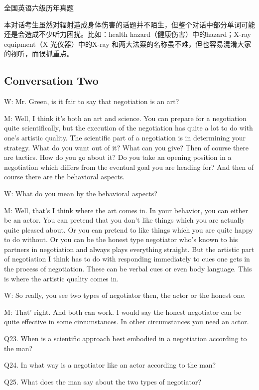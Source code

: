\documentclass[UTF8,11pt]{ctexart}
\begin{document}
全国英语六级历年真题


本对话考生虽然对辐射造成身体伤害的话题并不陌生，但整个对话中部分单词可能还是会造成不少听力困扰。比如：health hazard（健康伤害）中的hazard；X-ray equipment（X 光仪器）中的X-ray 和两大法案的名称虽不难，但也容易混淆大家的视听，而误抓重点。


\subsection*{Conversation Two}


W: Mr. Green, is it fair to say that negotiation is an art?


M: Well, I think it’s both an art and science. You can prepare for a negotiation quite scientifically, but the execution of the negotiation has quite a lot to do with one’s artistic quality. The scientific part of a negotiation is in determining your strategy. What do you want out of it? What can you give? Then of course there are tactics. How do you go about it? Do you take an opening position in a negotiation which differs from the eventual goal you are heading for? And then of course there are the behavioral aspects.


W: What do you mean by the behavioral aspects?


M: Well, that’s I think where the art comes in. In your behavior, you can either be an actor. You can pretend that you don’t like things which you are actually quite pleased about. Or you can pretend to like things which you are quite happy to do without. Or you can be the honest type negotiator who’s known to his partners in negotiation and always plays everything straight. But the artistic part of negotiation I think has to do with responding immediately to cues one gets in the process of negotiation. These can be verbal cues or even body language. This is where the artistic quality comes in.


W: So really, you see two types of negotiator then, the actor or the honest one.


M: That’ right. And both can work. I would say the honest negotiator can be quite effective in some circumstances. In other circumstances you need an actor.


Q23. When is a scientific approach best embodied in a negotiation according to the man?


Q24. In what way is a negotiator like an actor according to the man?


Q25. What does the man say about the two types of negotiator?
\end{document}
